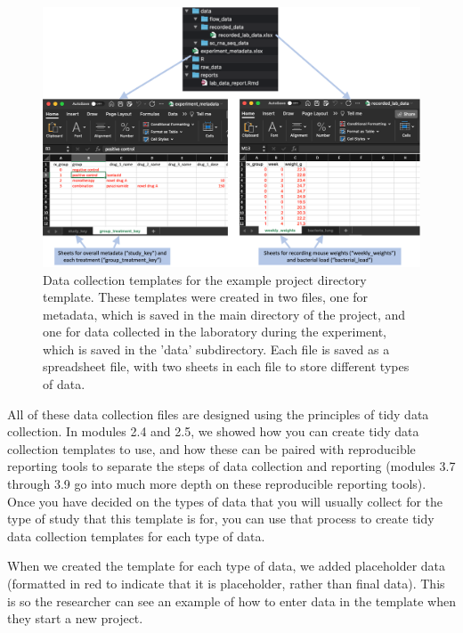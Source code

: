\documentclass[]{tufte-book}
\begin{document}
\begin{figure}
\includegraphics[width=\textwidth]{figures/project_data_collection} \caption[Data collection templates for the example project directory template]{Data collection templates for the example project directory template. These templates were created in two files, one for metadata, which is saved in the main directory of the project, and one for data collected in the laboratory during the experiment, which is saved in the 'data' subdirectory. Each file is saved as a spreadsheet file, with two sheets in each file to store different types of data.}\label{fig:projectdatacollection}
\end{figure}

All of these data collection files are designed using the principles of tidy
data collection. In modules 2.4 and 2.5, we showed how you can create tidy data
collection templates to use, and how these can be paired with
reproducible reporting tools to separate the steps of data collection and
reporting (modules 3.7 through 3.9 go into much more depth on these reproducible
reporting tools). Once you have decided on the types of data that you will
usually collect for the type of study that this template is for, you can use
that process to create tidy data collection templates for each type of data.

When we created the template for each type of data, we added placeholder data
(formatted in red to indicate that it is placeholder, rather than final
data). This is so the researcher can see an example of how to enter data in
the template when they start a new project.
\end{document}
